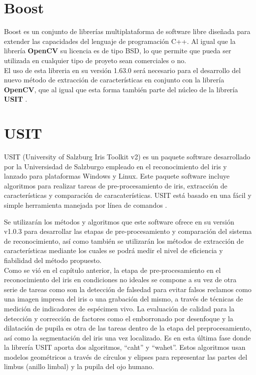 
\section{Boost}

Boost es un conjunto de librerías multiplataforma de software libre diseñada para extender las capacidades del lenguaje de programación C++. Al igual que la librería \textbf{OpenCV} su licencia es de tipo BSD, lo que permite que pueda ser utilizada en cualquier tipo de proyeto sean comerciales o no. \\

El uso de esta libreria en su versión 1.63.0 será necesario para el desarrollo del nuevo método de extracción de características en conjunto con la librería \textbf{OpenCV}, que al igual que esta forma también parte del núcleo de la librería \textbf{USIT} \cite{Reference17}. \\



\section{USIT}

USIT (University of Salzburg Iris Toolkit v2) es un paquete software desarrollado por la Universisdad de Salzburgo empleado en el reconocimiento del iris y lanzado para plataformas Windows y Linux. Este paquete software incluye algoritmos para realizar tareas de pre-procesamiento de iris, extracción de características y comparación de caracaterísticas. USIT está basado en una fácil y simple herramienta manejada por línea de comandos \cite{Reference18} \cite{Reference19}.

Se utilizarán los métodos y algoritmos que este software ofrece en su versión v1.0.3 para desarrollar las etapas de pre-procesamiento y comparación del sistema de reconocimiento, así como también se utilizarán los métodos de extracción de características mediante los cuales se podrá medir el nivel de eficiencia y fiabilidad del método propuesto. \\

Como se vió en el capítulo anterior, la etapa de pre-procesamiento en el reconocimiento del iris en condiciones no ideales se compone a su vez de otra serie de tareas como son la detección de falsedad para evitar falsos reclamos como una imagen impresa del iris o una grabación del mismo, a través de técnicas de medición de indicadores de espécimen vivo. La evaluación de calidad para la detección y corrección de factores como el emborronado por desenfoque y la dilatación de pupila es otra de las tareas dentro de la etapa del preprocesamiento, así como la segmentación del iris una vez localizado. Es en esta última fase donde la librería USIT aporta dos algoritmos, “caht” y “wahet”. Estos algoritmos usan modelos geométricos a través de círculos y elipses para representar las partes del limbus (anillo limbal) y la pupila del ojo humano. \\

